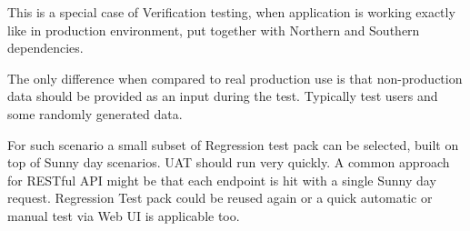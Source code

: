 	This is a special case of Verification testing, when application is working exactly like in production environment, put
	together with Northern and Southern dependencies.
	
	The only difference when compared to real production use is that non-production data should be provided as an input
	during the test. Typically test users and some randomly generated data.
	
	For such scenario a small subset of Regression test pack can be selected, built on top of Sunny day scenarios.
	UAT should run very quickly. A common approach for RESTful API might be that each endpoint is hit with a single Sunny
	day request. Regression Test pack could be reused again or a quick automatic or manual test via Web UI is applicable
	too.
